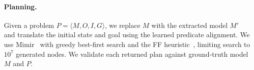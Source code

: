 \paragraph{Planning.}
Given a problem $P=\langle M,O,I,G\rangle$, we replace $M$ with the extracted model $M'$ and translate the initial state and goal using the learned predicate alignment. We use Mimir~\citep{mimir} with greedy best-first search and the FF heuristic~\citep{hoffmann2001ff}, limiting search to $10^7$ generated nodes. We validate each returned plan against ground-truth model $M$ and $P$.

